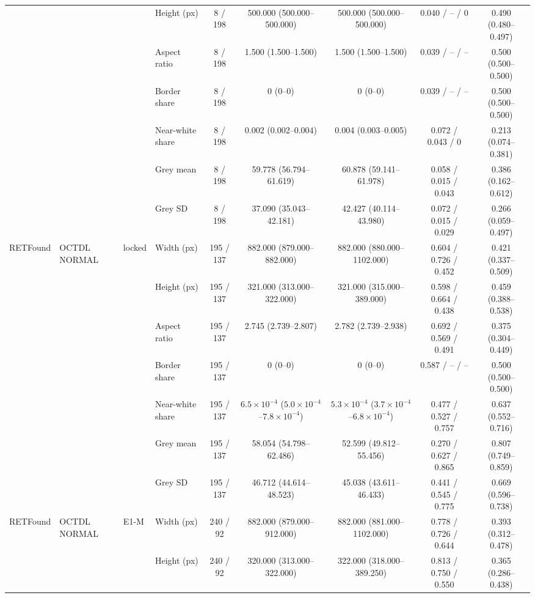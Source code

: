 \begin{longtable}{@{}llllccccc@{}}
 &  &  & Height (px) & 8 / 198 & 500.000 (500.000--500.000) & 500.000 (500.000--500.000) & 0.040 / -- / 0 & 0.490 (0.480--0.497) \\
 &  &  & Aspect ratio & 8 / 198 & 1.500 (1.500--1.500) & 1.500 (1.500--1.500) & 0.039 / -- / -- & 0.500 (0.500--0.500) \\
 &  &  & Border share & 8 / 198 & 0 (0--0) & 0 (0--0) & 0.039 / -- / -- & 0.500 (0.500--0.500) \\
 &  &  & Near-white share & 8 / 198 & 0.002 (0.002--0.004) & 0.004 (0.003--0.005) & 0.072 / 0.043 / 0 & 0.213 (0.074--0.381) \\
 &  &  & Grey mean & 8 / 198 & 59.778 (56.794--61.619) & 60.878 (59.141--61.978) & 0.058 / 0.015 / 0.043 & 0.386 (0.162--0.612) \\
 &  &  & Grey SD & 8 / 198 & 37.090 (35.043--42.181) & 42.427 (40.114--43.980) & 0.072 / 0.015 / 0.029 & 0.266 (0.059--0.497) \\
\addlinespace[1pt]
RETFound & OCTDL NORMAL & locked & Width (px) & 195 / 137 & 882.000 (879.000--882.000) & 882.000 (880.000--1102.000) & 0.604 / 0.726 / 0.452 & 0.421 (0.337--0.509) \\
 &  &  & Height (px) & 195 / 137 & 321.000 (313.000--322.000) & 321.000 (315.000--389.000) & 0.598 / 0.664 / 0.438 & 0.459 (0.388--0.538) \\
 &  &  & Aspect ratio & 195 / 137 & 2.745 (2.739--2.807) & 2.782 (2.739--2.938) & 0.692 / 0.569 / 0.491 & 0.375 (0.304--0.449) \\
 &  &  & Border share & 195 / 137 & 0 (0--0) & 0 (0--0) & 0.587 / -- / -- & 0.500 (0.500--0.500) \\
 &  &  & Near-white share & 195 / 137 & $6.5\times10^{-4}$ ($5.0\times10^{-4}$--$7.8\times10^{-4}$) & $5.3\times10^{-4}$ ($3.7\times10^{-4}$--$6.8\times10^{-4}$) & 0.477 / 0.527 / 0.757 & 0.637 (0.552--0.716) \\
 &  &  & Grey mean & 195 / 137 & 58.054 (54.798--62.486) & 52.599 (49.812--55.456) & 0.270 / 0.627 / 0.865 & 0.807 (0.749--0.859) \\
 &  &  & Grey SD & 195 / 137 & 46.712 (44.614--48.523) & 45.038 (43.611--46.433) & 0.441 / 0.545 / 0.775 & 0.669 (0.596--0.738) \\
\addlinespace[1pt]
RETFound & OCTDL NORMAL & E1-M & Width (px) & 240 / 92 & 882.000 (879.000--912.000) & 882.000 (881.000--1102.000) & 0.778 / 0.726 / 0.644 & 0.393 (0.312--0.478) \\
 &  &  & Height (px) & 240 / 92 & 320.000 (313.000--322.000) & 322.000 (318.000--389.250) & 0.813 / 0.750 / 0.550 & 0.365 (0.286--0.438) \\

\end{longtable}
